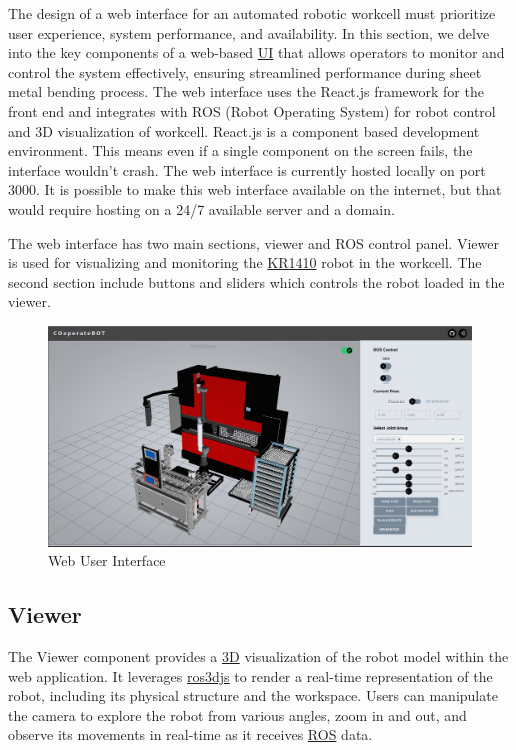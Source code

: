 The design of a web interface for an automated robotic workcell must prioritize user experience, system performance, and availability. In this section, we delve into the key components of a web-based \hyperref[acro:UI]{UI} that allows operators to monitor and control the system effectively, ensuring streamlined performance during sheet metal bending process. The web interface uses the React.js framework for the front end and integrates with ROS (Robot Operating System) for robot control and 3D visualization of workcell. React.js is a component based development environment. This means even if a single component on the screen fails, the interface wouldn't crash. The web interface is currently hosted locally on port 3000. It is possible to make this web interface available on the internet, but that would require hosting on a 24/7 available server and a domain.


The web interface has two main sections, viewer and ROS control panel. Viewer is used for visualizing and monitoring the \hyperref[acro:KR]{KR1410} robot in the workcell. The second section include buttons and sliders which controls the robot loaded in the viewer.

\begin{figure}[h]
    \centering
    \includegraphics[width=1\textwidth]{figures/webui/webui0.png}
    \caption{Web User Interface}
    \label{fig:web-ui}
\end{figure}

\subsection{Viewer}
\label{subsec:web-ui-viewer}
The Viewer component provides a \hyperref[acro:3D]{3D} visualization of the robot model within the web application. It leverages \hyperref[par:ros3djs]{ros3djs} to render a real-time representation of the robot, including its physical structure and the workspace. Users can manipulate the camera to explore the robot from various angles, zoom in and out, and observe its movements in real-time as it receives \hyperref[acro:ROS]{ROS} data.

